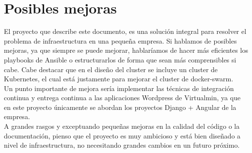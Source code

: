 \section{Posibles mejoras}
        \begin{text}
                El proyecto que describe este documento, es una solución integral para resolver el problema de infraestructura en una pequeña empresa. Si hablamos de posibles mejoras, ya que siempre se puede mejorar, hablaríamos de hacer más eficientes los playbooks de Ansible o estructurarlos de forma que sean más comprensibles si cabe. Cabe destacar que en el diseño del cluster se incluye un cluster de Kubernetes, el cual está justamente para mejorar el cluster de docker-swarm. \\
                Un punto importante de mejora sería implementar las técnicas de integración continua y entrega continua a las aplicaciones Wordpress de Virtualmin, ya que en este proyecto únicamente se abordan los proyectos Django + Angular de la empresa. \\
                A grandes rasgos y exceptuando pequeñas mejoras en la calidad del código o la documentación, pienso que el proyecto es muy ambicioso y está bien diseñado a nivel de infraestructura, no necesitando grandes cambios en un futuro próximo.
        \end{text}